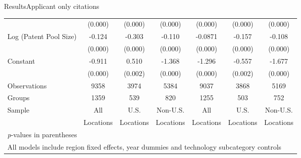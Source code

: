 \documentclass{beamer}
\begin{document}
\begin{frame}{Results}{Applicant only citations}
{\begin{tabular}{l*{6}{c}}
                &  (0.000)&  (0.000)&  (0.000)&  (0.000)&  (0.000)&  (0.000)\\
Log (Patent Pool Size)&   -0.124&   -0.303&   -0.110&  -0.0871&   -0.157&   -0.108\\
                &  (0.000)&  (0.000)&  (0.000)&  (0.000)&  (0.000)&  (0.000)\\
Constant        &   -0.911&    0.510&   -1.368&   -1.296&   -0.557&   -1.677\\
                &  (0.000)&  (0.002)&  (0.000)&  (0.000)&  (0.002)&  (0.000)\\
\hline
Observations    &     9358&     3974&     5384&     9037&     3868&     5169\\
Groups          &     1359&      539&      820&     1255&      503&      752\\
Sample&All &U.S. &Non-U.S.&All &U.S. &Non-U.S. \\
          &Locations &Locations&Locations&Locations &Locations&Locations \\\hline\hline
\multicolumn{7}{l}{\footnotesize \textit{p}-values in parentheses}\\
\multicolumn{7}{l}{\footnotesize All models include region fixed effects, year dummies and technology subcategory controls}\\
\end{tabular}
}
\end{frame}
\end{document}
